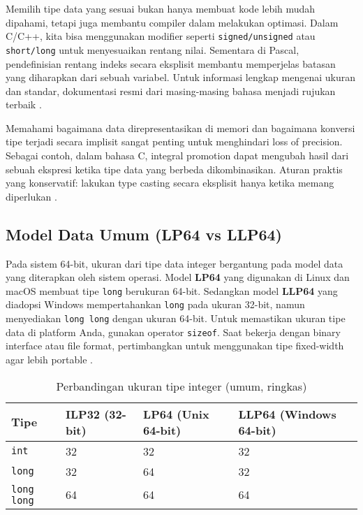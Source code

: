 \documentclass[../main.tex]{subfiles}
\begin{document}
Memilih tipe data yang sesuai bukan hanya membuat kode lebih mudah dipahami, tetapi juga membantu compiler dalam melakukan optimasi. Dalam C/C++, kita bisa menggunakan modifier seperti \texttt{signed/unsigned} atau \texttt{short/long} untuk menyesuaikan rentang nilai. Sementara di Pascal, pendefinisian rentang indeks secara eksplisit membantu memperjelas batasan yang diharapkan dari sebuah variabel. Untuk informasi lengkap mengenai ukuran dan standar, dokumentasi resmi dari masing-masing bahasa menjadi rujukan terbaik \parencite{free-pascal-docs,iso-c-draft-n1570,cpp-reference}.

Memahami bagaimana data direpresentasikan di memori dan bagaimana konversi tipe terjadi secara implisit sangat penting untuk menghindari loss of precision. Sebagai contoh, dalam bahasa C, integral promotion dapat mengubah hasil dari sebuah ekspresi ketika tipe data yang berbeda dikombinasikan. Aturan praktis yang konservatif: lakukan type casting secara eksplisit hanya ketika memang diperlukan \parencite{gnu-c-manual,cpp-reference}.

\subsection{Model Data Umum (LP64 vs LLP64)}
Pada sistem 64-bit, ukuran dari tipe data integer bergantung pada model data yang diterapkan oleh sistem operasi. Model \textbf{LP64} yang digunakan di Linux dan macOS membuat tipe \texttt{long} berukuran 64-bit. Sedangkan model \textbf{LLP64} yang diadopsi Windows mempertahankan \texttt{long} pada ukuran 32-bit, namun menyediakan \texttt{long long} dengan ukuran 64-bit. Untuk memastikan ukuran tipe data di platform Anda, gunakan operator \texttt{sizeof}. Saat bekerja dengan binary interface atau file format, pertimbangkan untuk menggunakan tipe fixed-width agar lebih portable \parencite{wikipedia-data-models,cpp-fundamental-types}.

\begin{table}[H]
  \centering
  \caption{Perbandingan ukuran tipe integer (umum, ringkas)}
  \small
  \begin{tabular}{@{}llll@{}}
    \toprule
    Tipe & ILP32 (32-bit) & LP64 (Unix 64-bit) & LLP64 (Windows 64-bit) \\
    \midrule
    \texttt{int}       & 32 & 32 & 32 \\
    \texttt{long}      & 32 & 64 & 32 \\
    \texttt{long long} & 64 & 64 & 64 \\
    \bottomrule
  \end{tabular}
  \\\parencite{wikipedia-data-models}
\end{table}
\end{document}
